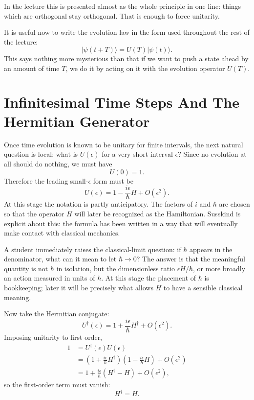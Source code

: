 In the lecture this is presented almost as the whole principle in one line: things which are orthogonal stay orthogonal. That is enough to force unitarity.

It is useful now to write the evolution law in the form used throughout the rest of the lecture:
\begin{equation}
|\psi(t+T)\rangle = U(T)|\psi(t)\rangle.
\end{equation}
This says nothing more mysterious than that if we want to push a state ahead by an amount of time $T$, we do it by acting on it with the evolution operator $U(T)$.

\section{Infinitesimal Time Steps And The Hermitian Generator}

Once time evolution is known to be unitary for finite intervals, the next natural question is local: what is $U(\epsilon)$ for a very short interval $\epsilon$? Since no evolution at all should do nothing, we must have
\begin{equation}
U(0)=1.
\end{equation}
Therefore the leading small-$\epsilon$ form must be
\begin{equation}
U(\epsilon)=1-\frac{i\epsilon}{\hbar}H+O(\epsilon^2).
\end{equation}
At this stage the notation is partly anticipatory. The factors of $i$ and $\hbar$ are chosen so that the operator $H$ will later be recognized as the Hamiltonian. Susskind is explicit about this: the formula has been written in a way that will eventually make contact with classical mechanics.

A student immediately raises the classical-limit question: if $\hbar$ appears in the denominator, what can it mean to let $\hbar\to 0$? The answer is that the meaningful quantity is not $\hbar$ in isolation, but the dimensionless ratio $\epsilon H/\hbar$, or more broadly an action measured in units of $\hbar$. At this stage the placement of $\hbar$ is bookkeeping; later it will be precisely what allows $H$ to have a sensible classical meaning.

Now take the Hermitian conjugate:
\begin{equation}
U^\dagger(\epsilon)=1+\frac{i\epsilon}{\hbar}H^\dagger+O(\epsilon^2).
\end{equation}
Imposing unitarity to first order,
\begin{align}
1
&=
U^\dagger(\epsilon)U(\epsilon) \\
&=
\left(1+\frac{i\epsilon}{\hbar}H^\dagger\right)
\left(1-\frac{i\epsilon}{\hbar}H\right)
+O(\epsilon^2) \\
&=
1+\frac{i\epsilon}{\hbar}(H^\dagger-H)+O(\epsilon^2),
\end{align}
so the first-order term must vanish:
\begin{equation}
H^\dagger=H.
\end{equation}

